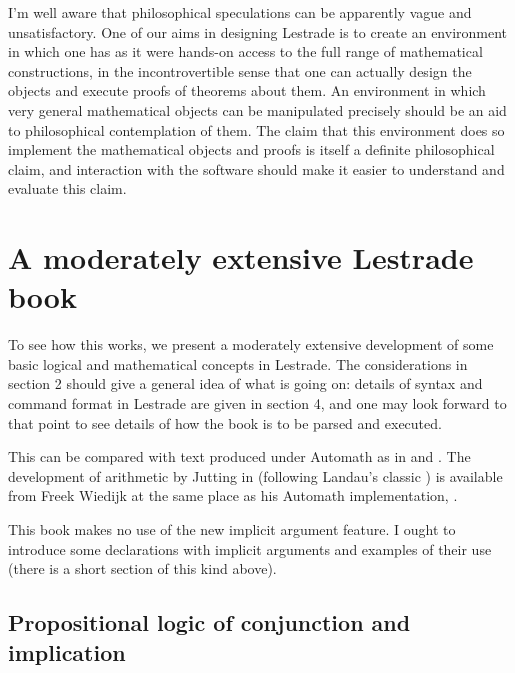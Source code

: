 \documentclass[12pt]{article}
\begin{document}
I'm well aware that philosophical speculations can be apparently vague and unsatisfactory.  One of our aims in designing Lestrade is to create an environment in which one has as it were hands-on access to the full range of mathematical constructions, in the incontrovertible sense that one can actually design the objects and execute proofs of theorems  about them.  An environment in which very general mathematical objects can be manipulated precisely should be an aid to philosophical contemplation of them.  The claim that this environment does so implement the mathematical objects and proofs is itself a definite philosophical claim, and interaction with the software should make it easier to understand and evaluate this claim.


\newpage



\section{A moderately extensive Lestrade book}

To see how this works, we present a moderately extensive development of some basic logical and mathematical concepts in Lestrade.  The considerations in section 2 should give a general idea of what is going on:  details of syntax and command format in Lestrade are given in section 4, and one may look forward to that point to see details of how the book is to be parsed and executed.

This can be compared with text produced under Automath as in \cite{automathtext} and \cite{grundlagen}.  The development of arithmetic by Jutting in \cite{grundlagen} (following Landau's classic \cite{landau}) is available from Freek Wiedijk at the same place as his Automath implementation, \cite{freek}.

This book makes no use of the new implicit argument feature.  I ought to introduce some declarations with implicit arguments and examples of their use (there is a short section of this kind above).

\subsection{Propositional logic of conjunction and implication}
\end{document}
